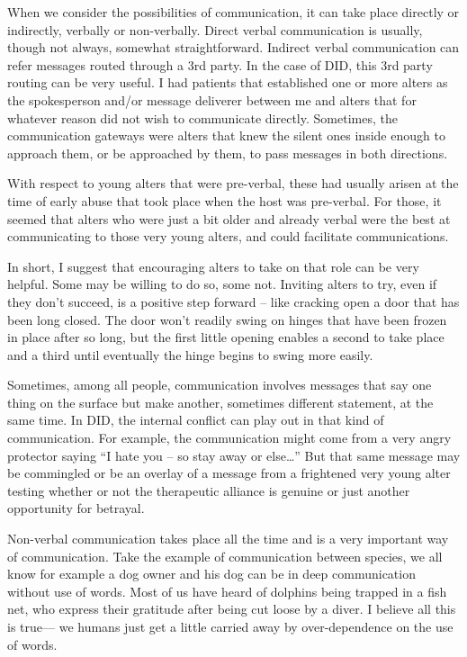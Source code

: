 \documentclass[]{book}
\begin{document}
When we consider the possibilities of communication, it can take place directly or indirectly, verbally or non-verbally. Direct verbal communication is usually, though not always, somewhat straightforward. Indirect verbal communication can refer messages routed through a 3rd party. In the case of DID, this 3rd party routing can be very useful. I had patients that established one or more alters as the spokesperson and/or message deliverer between me and alters that for whatever reason did not wish to communicate directly. Sometimes, the communication gateways were alters that knew the silent ones inside enough to approach them, or be approached by them, to pass messages in both directions.

With respect to young alters that were pre-verbal, these had usually arisen at the time of early abuse that took place when the host was pre-verbal. For those, it seemed that alters who were just a bit older and already verbal were the best at communicating to those very young alters, and could facilitate communications.

In short, I suggest that encouraging alters to take on that role can be very helpful. Some may be willing to do so, some not. Inviting alters to try, even if they don't succeed, is a positive step forward -- like cracking open a door that has been long closed. The door won't readily swing on hinges that have been frozen in place after so long, but the first little opening enables a second to take place and a third until eventually the hinge begins to swing more easily.

Sometimes, among all people, communication involves messages that say one thing on the surface but make another, sometimes different statement, at the same time. In DID, the internal conflict can play out in that kind of communication. For example, the communication might come from a very angry protector saying ``I hate you -- so stay away or else\ldots{}'' But that same message may be commingled or be an overlay of a message from a frightened very young alter testing whether or not the therapeutic alliance is genuine or just another opportunity for betrayal.

Non-verbal communication takes place all the time and is a very important way of communication. Take the example of communication between species, we all know for example a dog owner and his dog can be in deep communication without use of words. Most of us have heard of dolphins being trapped in a fish net, who express their gratitude after being cut loose by a diver. I believe all this is true--- we humans just get a little carried away by over-dependence on the use of words.
\end{document}
